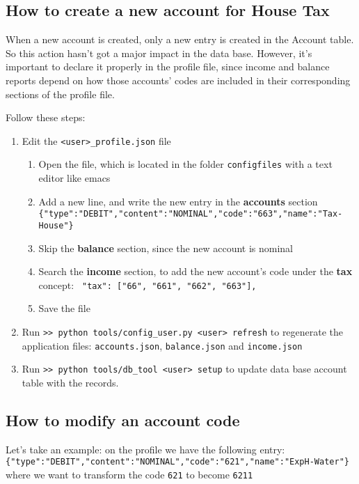 \documentclass[12pt, a4paper]{article}
\begin{document}
 
 \subsection{How to create a new account for House Tax}  
 When a new account is created, only a new entry is created in the Account table. 
 So this action hasn't got a major impact in the data base. 
 However, it's important to declare it properly in the profile file, since income and balance reports depend on how those accounts' codes are included in their corresponding sections of the profile file. 
 
 Follow these steps:
 \begin{enumerate}
 \item Edit the \verb!<user>_profile.json! file
 \begin{enumerate}
 \item Open the file, which is located in the folder \verb!configfiles! with a text editor like \textsf{emacs}
 \item Add a new line, and  write the new entry in the \textbf{accounts} section\\ 
 	\verb!{"type":"DEBIT","content":"NOMINAL","code":"663","name":"Tax-House"}!
\item Skip the \textbf{balance} section, since the new account is  nominal
\item Search the \textbf{income} section, to add the new account's code under the \textbf{tax} concept:
	\verb! "tax": ["66", "661", "662", "663"], ! 
\item Save the file
\end{enumerate}
\item Run \verb!>> python tools/config_user.py <user> refresh! to regenerate the application files: \verb!accounts.json!, \verb!balance.json! and \verb!income.json! 
\item Run \verb!>> python tools/db_tool <user> setup! to  update data base account table with the records. 
 \end{enumerate}
 

\subsection{How to modify an account code}  
Let's take an example: on the profile we have the following entry:\\
\verb!{"type":"DEBIT","content":"NOMINAL","code":"621","name":"ExpH-Water"}!
where we want to transform the code \verb!621! to become \verb!6211!
\end{document}
